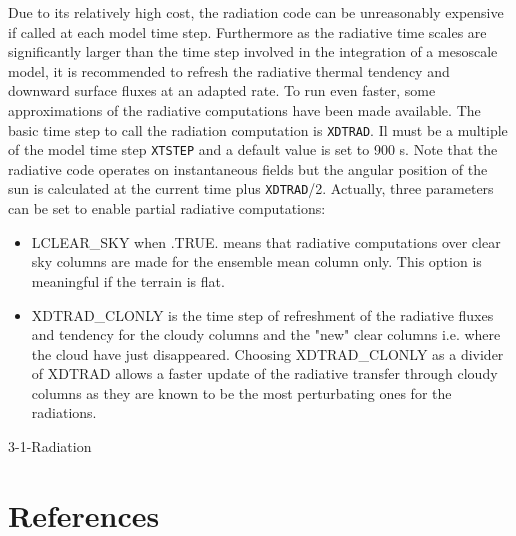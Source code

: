 Due to its relatively high cost, the radiation code can be unreasonably expensive if called at each model time step. Furthermore as the radiative time scales are significantly larger than the time step involved in the integration of a mesoscale model, it is recommended to refresh the radiative thermal tendency and downward surface fluxes at an adapted rate. To run even faster, some approximations of the radiative computations have been made available. The basic time step to call the radiation computation is {\tt XDTRAD}. Il must be a multiple of the model time step {\tt XTSTEP} and a default value is set to 900 s. Note that the radiative code operates on instantaneous fields but the angular position of the sun is calculated at the current time plus {\tt XDTRAD}/2. Actually, three parameters can be set to enable partial radiative computations:

\begin{itemize}
\item LCLEAR\_SKY when .TRUE. means that radiative computations over clear sky columns are made for the ensemble mean column only. This option is meaningful if the terrain is flat.

\item XDTRAD\_CLONLY is the time step of refreshment of the radiative fluxes and tendency for the cloudy columns and the "new" clear columns i.e. where the cloud have just disappeared. Choosing XDTRAD\_CLONLY as a divider of XDTRAD allows a faster update of the radiative transfer through cloudy columns as they are known to be the most perturbating ones for the radiations. 

\end{itemize}

\begin{btSect}{3-1-Radiation}
\section{References}
\btPrintCited
\end{btSect}
